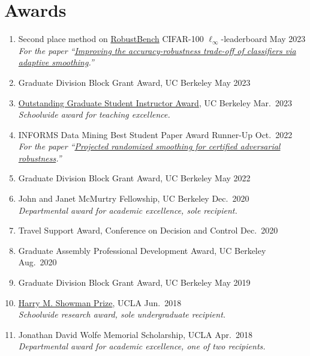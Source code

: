 \documentclass[11pt]{article}
\newcommand{\cvdate}[1]{\hfill#1}			%
\begin{document}
	\section{Awards}
	\begin{enumerate}[label={\arabic*.}]
		\item Second place method on \href{https://robustbench.github.io/#div_cifar100_Linf_heading}{RobustBench} CIFAR-100 $\ell_\infty$-leaderboard
		\cvdate{May 2023} \\
		\textit{For the paper ``\href{https://bai-yt.github.io/files/publications/AdaptiveSmoothing_PrePrint.pdf}{Improving the accuracy-robustness trade-off of classifiers via adaptive smoothing}.''}
		\item Graduate Division Block Grant Award, UC Berkeley
		\cvdate{May 2023}
		\item \href{https://gsi.berkeley.edu/programs-services/award-programs/ogsi/ogsi-recipients-2022-2023/}{Outstanding Graduate Student Instructor Award}, UC Berkeley
		\cvdate{Mar.\ 2023} \\
		\textit{Schoolwide award for teaching excellence.}
		\item INFORMS Data Mining Best Student Paper Award Runner-Up
		\cvdate{Oct.\ 2022} \\
		\textit{For the paper ``\href{https://brendon-anderson.github.io/files/publications/pfrommer2023projected.pdf}{Projected randomized smoothing for certified adversarial robustness}.''}
		\item Graduate Division Block Grant Award, UC Berkeley
		\cvdate{May 2022}
		\item John and Janet McMurtry Fellowship, UC Berkeley
		\cvdate{Dec.\ 2020} \\
		\textit{Departmental award for academic excellence, sole recipient.}
		\item Travel Support Award, Conference on Decision and Control
		\cvdate{Dec.\ 2020}
		\item Graduate Assembly Professional Development Award, UC Berkeley
		\cvdate{Aug.\ 2020}
		\item Graduate Division Block Grant Award, UC Berkeley
		\cvdate{May 2019}
		\item \href{https://samueli.ucla.edu/2018-ucla-samueli-commencement-awards/}{Harry M. Showman Prize}, UCLA
		\cvdate{Jun.\ 2018} \\
		\textit{Schoolwide research award, sole undergraduate recipient.}
	\item Jonathan David Wolfe Memorial Scholarship, UCLA
		\cvdate{Apr.\ 2018} \\
		\textit{Departmental award for academic excellence, one of two recipients.}
	\end{enumerate}
	
\end{document}
